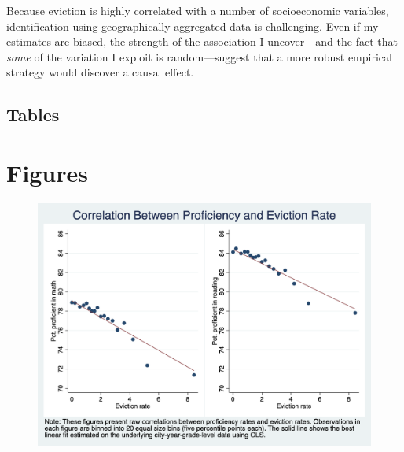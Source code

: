 \documentclass[12pt]{article}
\begin{document}
Because eviction is highly correlated with a number of socioeconomic variables, identification using geographically aggregated data is challenging. Even if my estimates are biased, the strength of the association I uncover—and the fact that \textit{some} of the variation I exploit is random—suggest that a more robust empirical strategy would discover a causal effect.




\singlespacing
\setlength\bibsep{0pt}





\clearpage

\onehalfspacing


\begin{landscape}
\section*{Tables} \label{sec:tab}

\end{landscape}




\newpage
{}
\begin{landscape}

\end{landscape}
\restoregeometry


\clearpage

\section*{Figures} \label{sec:fig}

\begin{figure}[H]
    \centering
    \includegraphics[scale=0.4]{output/graphs/outcome_binscatter.png}
    \caption{}
    \label{fig:my_label}
\end{figure}
\end{document}
